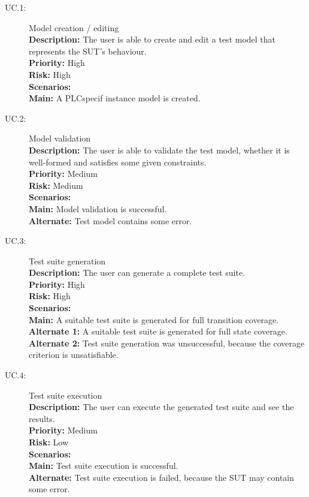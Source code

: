 \begin{description}
	\item[UC.1:] Model creation / editing\\
		\textbf{Description:} The user is able to create and edit a test model that represents the SUT's behaviour.\\
		\textbf{Priority:} High\\
		\textbf{Risk:} High\\
		\textbf{Scenarios:}\\
			\-\hspace{0,5cm}\textbf{Main:} A PLCspecif instance model is created.
	\item[UC.2:] Model validation\\
		\textbf{Description:} The user is able to validate the test model, whether it is well-formed and satisfies some given constraints.\\
		\textbf{Priority:} Medium\\
		\textbf{Risk:} Medium\\
		\textbf{Scenarios:}\\
			\-\hspace{0,5cm}\textbf{Main:} Model validation is successful.\\
			\-\hspace{0,5cm}\textbf{Alternate:} Test model contains some error.
	\item[UC.3:] Test suite generation\\
		\textbf{Description:} The user can generate a complete test suite.\\
		\textbf{Priority:} High\\
		\textbf{Risk:} High\\
		\textbf{Scenarios:}\\
			\-\hspace{0,5cm}\textbf{Main:} A suitable test suite is generated for full transition coverage.\\
			\-\hspace{0,5cm}\textbf{Alternate 1:} A suitable test suite is generated for full state coverage.\\
			\-\hspace{0,5cm}\textbf{Alternate 2:} Test suite generation was unsuccessful, because the coverage criterion is unsatisfiable.
	\item[UC.4:] Test suite execution\\
		\textbf{Description:} The user can execute the generated test suite and see the results.\\
		\textbf{Priority:} Medium\\
		\textbf{Risk:} Low\\
		\textbf{Scenarios:}\\
			\-\hspace{0,5cm}\textbf{Main:} Test suite execution is successful.\\
			\-\hspace{0,5cm}\textbf{Alternate:} Test suite execution is failed, because the SUT may contain some error.
\end{description}

